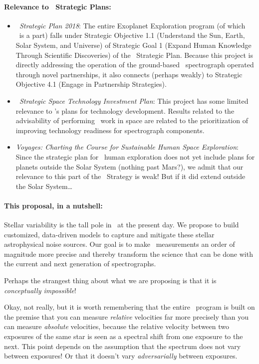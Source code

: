 \documentclass[12pt, letterpaper]{article}
\begin{document}
\paragraph{Relevance to \NASA\ Strategic Plans:}
\begin{itemize}
\item
\textit{\NASA\ Strategic Plan 2018}:
The entire Exoplanet Exploration program (of which \XRP\ is a part) falls under
Strategic Objective 1.1 (Understand the Sun, Earth, Solar System, and Universe)
of Strategic Goal 1 (Expand Human Knowledge Through Scientific Discoveries) of the
\NASA\ Strategic Plan.
Because this project is directly addressing the operation of the
ground-based \NNEXPLORE\ spectrograph operated through novel
partnerships, it also connects (perhaps weakly) to Strategic Objective
4.1 (Engage in Partnership Strategies).
\item
\textit{\NASA\ Strategic Space Technology Investment Plan}:
This project has some limited relevance to \NASA's plans for technology development.
Results related to the advisability of performing \EPRV\ work in space are related to
the prioritization of improving technology readiness for spectrograph components.
\item
\textit{Voyages: Charting the Course for Sustainable Human Space
  Exploration}: Since the strategic plan for \NASA\ human exploration
does not yet include plans for planets outside the Solar System
(nothing past Mars?), we admit that our relevance to this part of the
\NASA\ Strategy is weak! But if it did extend outside the Solar System\ldots
\end{itemize}

\paragraph{This proposal, in a nutshell:}
Stellar variability is the tall pole in \EPRV\ at the present day.
We propose to build customized, data-driven models to capture and mitigate these
stellar astrophysical noise sources.
Our goal is to make \EPRV\ measurements an order of magnitude more precise
and thereby transform the science
that can be done with the current and next generation of spectrographs.


Perhaps the strangest thing about what we are proposing is that
it is \emph{conceptually impossible}!

Okay, not really, but it is worth remembering that the entire
\EPRV\ program is built on the premise that you can measure
\emph{relative} velocities far more precisely than you can measure
\emph{absolute} velocities, because the relative velocity between two
exposures of the same star is seen as a spectral shift from one
exposure to the next.
This point depends on the assumption that the spectrum does not vary
between exposures!
Or that it doesn't vary \emph{adversarially} between exposures.
\end{document}
